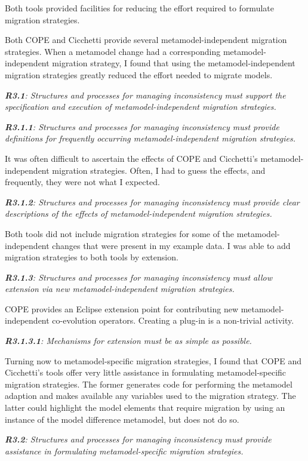 \documentclass[a4paper]{article}
\begin{document}
Both tools provided facilities for reducing the effort required to formulate migration strategies.

Both COPE and Cicchetti provide several metamodel-independent migration strategies. When a metamodel change had a corresponding metamodel-independent migration strategy, I found that using the metamodel-independent migration strategies greatly reduced the effort needed to migrate models.

\emph{\textbf{R3.1}: Structures and processes for managing inconsistency must support the specification and execution of metamodel-independent migration strategies.}

\emph{\textbf{R3.1.1}: Structures and processes for managing inconsistency must provide definitions for frequently occurring metamodel-independent migration strategies.}

It was often difficult to ascertain the effects of COPE and Cicchetti's metamodel-independent migration strategies. Often, I had to guess the effects, and frequently, they were not what I expected.

\emph{\textbf{R3.1.2}: Structures and processes for managing inconsistency must provide clear descriptions of the effects of metamodel-independent migration strategies.}

Both tools did not include migration strategies for some of the metamodel-independent changes that were present in my example data. I was able to add migration strategies to both tools by extension. 

\emph{\textbf{R3.1.3}: Structures and processes for managing inconsistency must allow extension via new metamodel-independent migration strategies.}

COPE provides an Eclipse extension point for contributing new metamodel-independent co-evolution operators. Creating a plug-in is a non-trivial activity. 

\emph{\textbf{R3.1.3.1}: Mechanisms for extension must be as simple as possible.}


Turning now to metamodel-specific migration strategies, I found that COPE and Cicchetti's tools offer very little assistance in formulating metamodel-specific migration strategies. The former generates code for performing the metamodel adaption and makes available any variables used to the migration strategy. The latter could highlight the model elements that require migration by using an instance of the model difference metamodel, but does not do so.

\emph{\textbf{R3.2}: Structures and processes for managing inconsistency must provide assistance in formulating metamodel-specific migration strategies.}
\end{document}
